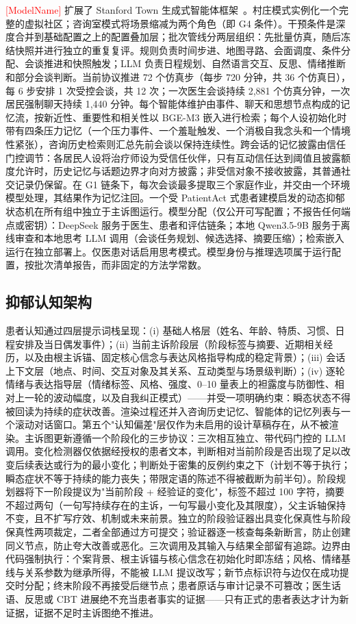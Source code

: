 \documentclass[11pt,a4paper]{article}
\newcommand{\ph}[1]{\textcolor{red}{[#1]}}
\begin{document}
\ph{ModelName} 扩展了 Stanford Town 生成式智能体框架~\cite{park2023}。村庄模式实例化一个完整的虚拟社区；咨询室模式将场景缩减为两个角色（即 G4 条件）。干预条件是深度合并到基础配置之上的配置叠加层；批次管线分两层组织：先批量仿真，随后冻结快照并进行独立的重复复评。规则负责时间步进、地图寻路、会面调度、条件分配、会谈推进和快照触发；LLM 负责日程规划、自然语言交互、反思、情绪推断和部分会谈判断。当前协议推进 72 个仿真步（每步 720 分钟，共 36 个仿真日），每 6 步安排 1 次受控会谈，共 12 次；一次医生会谈持续 2,881 个仿真分钟，一次居民强制聊天持续 1,440 分钟。每个智能体维护由事件、聊天和思想节点构成的记忆流，按新近性、重要性和相关性以 BGE-M3 嵌入进行检索；每个人设初始化时带有四条压力记忆（一个压力事件、一个羞耻触发、一个消极自我念头和一个情境性紧张），咨询历史检索则汇总先前会谈以保持连续性。跨会话的记忆披露由信任门控调节：各居民人设将治疗师设为受信任伙伴，只有互动信任达到阈值且披露额度允许时，历史记忆与话题边界才向对方披露；非受信对象不接收披露，其普通社交记录仍保留。在 G1 链条下，每次会谈最多提取三个家庭作业，并交由一个环境模型处理，其结果作为记忆注回。一个受 PatientAct 式患者建模启发的动态抑郁状态机在所有组中独立于主诉图运行。模型分配（仅公开可写配置；不报告任何端点或密钥）：DeepSeek 服务于医生、患者和评估链条；本地 Qwen3.5-9B 服务于离线审查和本地思考 LLM 调用（会谈任务规划、候选选择、摘要压缩）；检索嵌入运行在独立部署上。仅医患对话启用思考模式。模型身份与推理选项属于运行配置，按批次清单报告，而非固定的方法学常数。

\subsection*{抑郁认知架构}

患者认知通过四层提示词栈呈现：(i) 基础人格层（姓名、年龄、特质、习惯、日程安排及当日偶发事件）；(ii) 当前主诉阶段层（阶段标签与摘要、近期相关经历，以及由根主诉锚、固定核心信念与表达风格指导构成的稳定背景）；(iii) 会话上下文层（地点、时间、交互对象及其关系、互动类型与场景级判断）；(iv) 逐轮情绪与表达指导层（情绪标签、风格、强度、0--10 量表上的袒露度与防御性、相对上一轮的波动幅度，以及自我纠正模式）——并受一项明确约束：瞬态状态不得被回读为持续的症状改善。渲染过程还并入咨询历史记忆、智能体的记忆列表与一个滚动对话窗口。第五个"认知偏差"层仅作为未启用的设计草稿存在，从不被渲染。主诉图更新遵循一个阶段化的三步协议：三次相互独立、带代码门控的 LLM 调用。变化检测器仅依据经授权的患者文本，判断相对当前阶段是否出现了足以改变后续表达或行为的最小变化；判断处于密集的反例约束之下（计划不等于执行；瞬态症状不等于持续的能力丧失；带限定语的陈述不得被截断为前半句）。阶段规划器将下一阶段提议为"当前阶段 + 经验证的变化"，标签不超过 100 字符，摘要不超过两句（一句写持续存在的主诉，一句写最小变化及其限度），父主诉轴保持不变，且不扩写疗效、机制或未来前景。独立的阶段验证器出具变化保真性与阶段保真性两项裁定，二者全部通过方可提交；验证器逐一核查每条新断言，防止创建同义节点，防止夸大改善或恶化。三次调用及其输入与结果全部留有追踪。边界由代码强制执行：个案背景、根主诉锚与核心信念在初始化时即冻结；风格、情绪基线与关系参数为继承所得，不能被 LLM 提议改写；新节点标识符与边仅在成功提交时分配；终末阶段不再接受后继节点；患者原话与审计记录不可篡改；医生话语、反思或 CBT 进展绝不充当患者事实的证据——只有正式的患者表达才计为新证据，证据不足时主诉图绝不推进。
\end{document}
